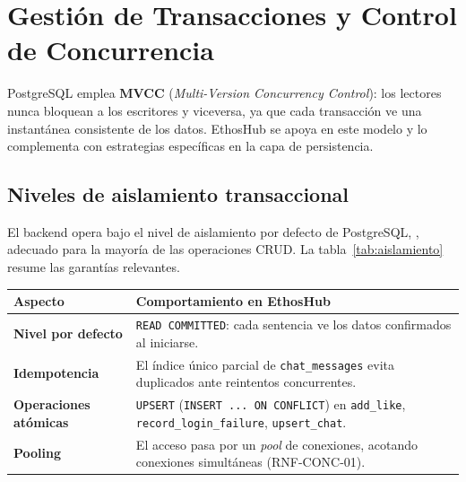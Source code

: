 \section{Gestión de Transacciones y Control de Concurrencia}
\label{sec:concurrencia}

PostgreSQL emplea \textbf{MVCC} (\textit{Multi-Version Concurrency Control}): los lectores
nunca bloquean a los escritores y viceversa, ya que cada transacción ve una instantánea
consistente de los datos. EthosHub se apoya en este modelo y lo complementa con
estrategias específicas en la capa de persistencia.

\subsection{Niveles de aislamiento transaccional}
\label{subsec:aislamiento}

El backend opera bajo el nivel de aislamiento por defecto de PostgreSQL,
, adecuado para la mayoría de las operaciones CRUD. La
tabla~\ref{tab:aislamiento} resume las garantías relevantes.

\vspace{0.2cm}
\noindent
\renewcommand{\arraystretch}{1.3}
\fontsize{9}{10.8}\selectfont\sffamily
\begin{tabularx}{\textwidth}{|>{\bfseries\color{colorPrimario}}l|X|}
\hline
\rowcolor{headerTabla}
\textbf{Aspecto} & \textbf{Comportamiento en EthosHub} \\
\hline
Nivel por defecto & \texttt{READ COMMITTED}: cada sentencia ve los datos confirmados al iniciarse. \\
\hline
\rowcolor{grisTecnico}
Idempotencia & El índice único parcial de \texttt{chat\_messages} evita duplicados ante reintentos concurrentes. \\
\hline
Operaciones atómicas & \texttt{UPSERT} (\texttt{INSERT ... ON CONFLICT}) en \texttt{add\_like}, \texttt{record\_login\_failure}, \texttt{upsert\_chat}. \\
\hline
\rowcolor{grisTecnico}
Pooling & El acceso pasa por un \textit{pool} de conexiones, acotando conexiones simultáneas (RNF-CONC-01). \\
\hline
\end{tabularx}
\label{tab:aislamiento}

